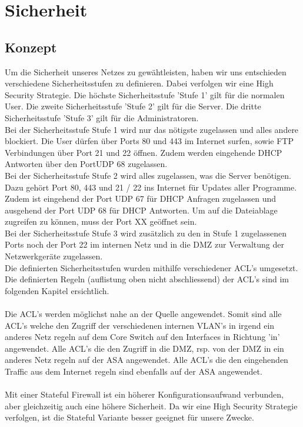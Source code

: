 \documentclass[11pt,a4paper,parskip=half]{scrartcl}
\begin{document}
\section{Sicherheit}
\subsection{Konzept}
Um die Sicherheit unseres Netzes zu gewähtleisten, haben wir uns entschieden verschiedene Sicherheitsstufen zu definieren. Dabei verfolgen wir eine High Security Strategie. Die höchste Sicherheitsstufe 'Stufe 1' gilt für die normalen User. Die zweite Sicherheitsstufe 'Stufe 2' gilt für die Server. Die dritte Sicherheitsstufe 'Stufe 3' gilt für die Administratoren.\\
Bei der Sicherheitsstufe Stufe 1 wird nur das nötigste zugelassen und alles andere blockiert. Die User dürfen über Ports 80 und 443 im Internet surfen, sowie FTP Verbindungen über Port 21 und 22 öffnen. Zudem werden eingehende DHCP Antworten über den PortUDP  68 zugelassen.\\
Bei der Sicherheitsstufe Stufe 2 wird alles zugelassen, was die Server benötigen. Dazu gehört Port 80, 443 und 21 / 22 ins Internet für Updates aller Programme. Zudem ist eingehend der Port UDP 67 für DHCP Anfragen zugelassen und ausgehend der Port UDP 68 für DHCP Antworten. Um auf die Dateiablage zugreifen zu können, muss der Port XX geöffnet sein.\\
Bei der Sicherheitsstufe Stufe 3 wird zusätzlich zu den in Stufe 1 zugelassenen Ports noch der Port 22 im internen Netz und in die DMZ zur Verwaltung der Netzwerkgeräte zugelassen.\\
Die definierten Sicherheitsstufen wurden mithilfe verschiedener ACL's umgesetzt. Die definierten Regeln (auflistung oben nicht abschliessend) der ACL's sind im folgenden Kapitel ersichtlich.\\
\\
Die ACL's werden möglichst nahe an der Quelle angewendet. Somit sind alle ACL's welche den Zugriff der verschiedenen internen VLAN's in irgend ein anderes Netz regeln auf dem Core Switch auf den Interfaces in Richtung 'in' angewendet. Alle ACL's die den Zugriff in die DMZ, rsp. von der DMZ in ein anderes Netz regeln auf der ASA angewendet. Alle ACL's die den eingehenden Traffic aus dem Internet regeln sind ebenfalls auf der ASA angewendet.\\
\\
Mit einer Stateful Firewall ist ein höherer Konfigurationsaufwand verbunden, aber gleichzeitig auch eine höhere Sicherheit. Da wir eine High Security Strategie verfolgen, ist die Stateful Variante besser geeignet für unsere Zwecke.\\
\end{document}
